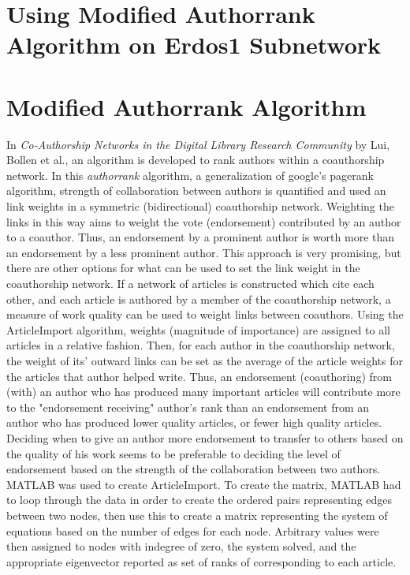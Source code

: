 \documentclass[12pt]{article} %
\begin{document}
\section{Using Modified Authorrank Algorithm on Erdos1 Subnetwork}
\section{Modified Authorrank Algorithm}
In \textit{Co-Authorship Networks in the Digital Library Research Community} by Lui, Bollen et al., an algorithm is developed to rank authors within a coauthorship network. In this \textit{authorrank} algorithm, a generalization of google's pagerank algorithm, strength of collaboration between authors is quantified and used an link weights in a symmetric (bidirectional) coauthorship network. Weighting the links in this way aims to weight the vote (endorsement) contributed by an author to a coauthor. Thus, an endorsement by a prominent author is worth more than an endorsement by a less prominent author. 
  This approach is very promising, but there are other options for what can be used to set the link weight in the coauthorship network. If a network of articles is constructed which cite each other, and each article is authored by a member of the coauthorship network, a measure of work quality can be used to weight links between coauthors. Using the ArticleImport algorithm, weights (magnitude of importance) are assigned to all articles in a relative fashion. Then, for each author in the coauthorship network, the weight of its' outward links can be set as the average of the article weights for the articles that author helped write. Thus, an endorsement (coauthoring) from (with) an author who has produced many important articles will contribute more to the "endorsement receiving" author's rank than an endorsement from an author who has produced lower quality articles, or fewer high quality articles. Deciding when to give an author more endorsement to transfer to others based on the quality of his work seems to be preferable to deciding the level of endorsement based on the strength of the collaboration between two authors. 
   MATLAB was used to create ArticleImport. To create the matrix, MATLAB had to loop through the data in order to create the ordered pairs representing edges between two nodes, then use this to create a matrix representing the system of equations based on the number of edges for each node. Arbitrary values were then assigned to nodes with indegree of zero, the system solved, and the appropriate eigenvector reported as set of ranks of corresponding to each article.
\end{document}
